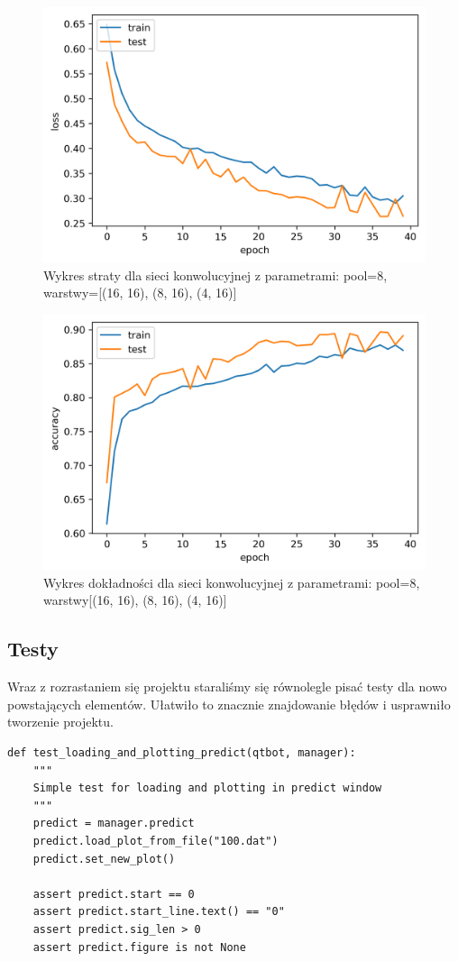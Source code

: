 \documentclass[polish,12pt]{aghthesis}
\begin{document}
\begin{figure}[H]
	\centering
	\captionsetup{justification=centering}
	\includegraphics[width=0.7\linewidth]{conv_8_16_loss.png}
	\caption{Wykres straty dla sieci konwolucyjnej z parametrami: pool=8, warstwy=[(16, 16), (8, 16), (4, 16)]}
	\label{fig:conv_8_16_loss}
\end{figure}
\begin{figure}[H]
	\centering
	\captionsetup{justification=centering}
	\includegraphics[width=0.7\linewidth]{conv_8_16_acc.png}
	\caption{Wykres dokładności dla sieci konwolucyjnej z parametrami: pool=8, warstwy[(16, 16), (8, 16), (4, 16)]}
	\label{fig:conv_8_16_acc}
\end{figure}


\subsection{Testy}

Wraz z rozrastaniem się projektu staraliśmy się równolegle pisać testy dla nowo powstających elementów. Ułatwiło to znacznie znajdowanie błędów i usprawniło tworzenie projektu.
\begin{lstlisting}[float=h!, caption={Przykładowy test interfejsu}]
def test_loading_and_plotting_predict(qtbot, manager):
    """
    Simple test for loading and plotting in predict window
    """
    predict = manager.predict
    predict.load_plot_from_file("100.dat")
    predict.set_new_plot()

    assert predict.start == 0
    assert predict.start_line.text() == "0"
    assert predict.sig_len > 0
    assert predict.figure is not None
\end{lstlisting}
\end{document}
